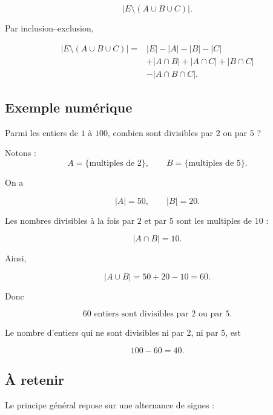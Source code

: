 \[
|E\setminus(A\cup B\cup C)|.
\]

Par inclusion--exclusion,

\[
\boxed{
\begin{aligned}
|E\setminus(A\cup B\cup C)|
={}&|E|-|A|-|B|-|C|\\
&+|A\cap B|+|A\cap C|+|B\cap C|\\
&-|A\cap B\cap C|.
\end{aligned}
}
\]

\subsection{Exemple numérique}

Parmi les entiers de \(1\) à \(100\), combien sont divisibles par \(2\) ou par
\(5\) ?

Notons :
\[
A=\{\text{multiples de }2\},
\qquad
B=\{\text{multiples de }5\}.
\]

On a

\[
|A|=50,
\qquad
|B|=20.
\]

Les nombres divisibles à la fois par \(2\) et par \(5\) sont les multiples de
\(10\) :

\[
|A\cap B|=10.
\]

Ainsi,

\[
|A\cup B|
=
50+20-10
=
60.
\]

Donc

\[
\boxed{60\text{ entiers sont divisibles par }2\text{ ou par }5.}
\]

Le nombre d'entiers qui ne sont divisibles ni par \(2\), ni par \(5\), est

\[
100-60=40.
\]

\subsection{À retenir}

\begin{center}
\end{center}

Le principe général repose sur une alternance de signes :


